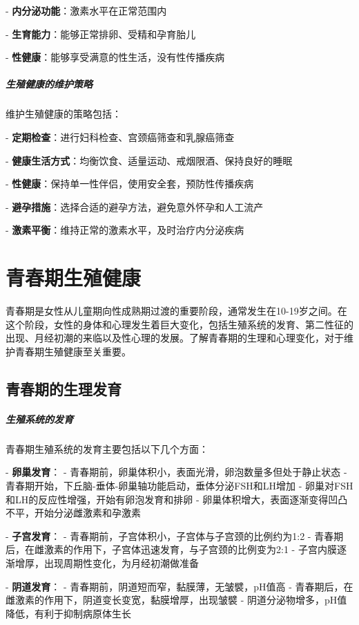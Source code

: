 \begin{enumerate}
- \textbf{内分泌功能}：激素水平在正常范围内

- \textbf{生育能力}：能够正常排卵、受精和孕育胎儿

- \textbf{性健康}：能够享受满意的性生活，没有性传播疾病

\subparagraph{生殖健康的维护策略}

维护生殖健康的策略包括：

- \textbf{定期检查}：进行妇科检查、宫颈癌筛查和乳腺癌筛查

- \textbf{健康生活方式}：均衡饮食、适量运动、戒烟限酒、保持良好的睡眠

- \textbf{性健康}：保持单一性伴侣，使用安全套，预防性传播疾病

- \textbf{避孕措施}：选择合适的避孕方法，避免意外怀孕和人工流产

- \textbf{激素平衡}：维持正常的激素水平，及时治疗内分泌疾病

\section{青春期生殖健康}

青春期是女性从儿童期向性成熟期过渡的重要阶段，通常发生在10-19岁之间。在这个阶段，女性的身体和心理发生着巨大变化，包括生殖系统的发育、第二性征的出现、月经初潮的来临以及性心理的发展。了解青春期的生理和心理变化，对于维护青春期生殖健康至关重要。

\subsection{青春期的生理发育}

\subparagraph{生殖系统的发育}

青春期生殖系统的发育主要包括以下几个方面：

- \textbf{卵巢发育}：
  - 青春期前，卵巢体积小，表面光滑，卵泡数量多但处于静止状态
  - 青春期开始，下丘脑-垂体-卵巢轴功能启动，垂体分泌FSH和LH增加
  - 卵巢对FSH和LH的反应性增强，开始有卵泡发育和排卵
  - 卵巢体积增大，表面逐渐变得凹凸不平，开始分泌雌激素和孕激素

- \textbf{子宫发育}：
  - 青春期前，子宫体积小，子宫体与子宫颈的比例约为1:2
  - 青春期后，在雌激素的作用下，子宫体迅速发育，与子宫颈的比例变为2:1
  - 子宫内膜逐渐增厚，出现周期性变化，为月经初潮做准备

- \textbf{阴道发育}：
  - 青春期前，阴道短而窄，黏膜薄，无皱襞，pH值高
  - 青春期后，在雌激素的作用下，阴道变长变宽，黏膜增厚，出现皱襞
  - 阴道分泌物增多，pH值降低，有利于抑制病原体生长


\end{enumerate}
